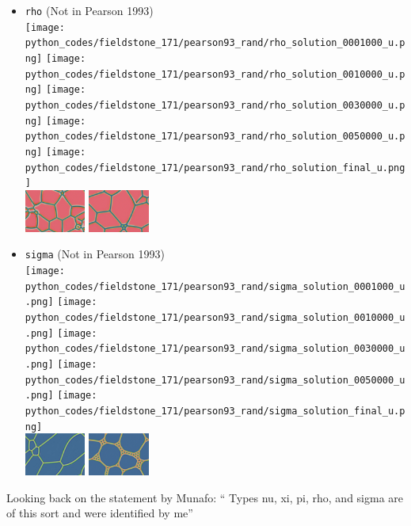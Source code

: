 \begin{itemize}
\item {\tt rho} (Not in Pearson 1993)\\
\texttt{[image: python\_codes/fieldstone\_171/pearson93\_rand/rho\_solution\_0001000\_u.png]}
\texttt{[image: python\_codes/fieldstone\_171/pearson93\_rand/rho\_solution\_0010000\_u.png]}
\texttt{[image: python\_codes/fieldstone\_171/pearson93\_rand/rho\_solution\_0030000\_u.png]}
\texttt{[image: python\_codes/fieldstone\_171/pearson93\_rand/rho\_solution\_0050000\_u.png]}
\texttt{[image: python\_codes/fieldstone\_171/pearson93\_rand/rho\_solution\_final\_u.png]}\\
\includegraphics[height=1.4cm]{python_codes/fieldstone_171/images/munafo_rho1}
\includegraphics[height=1.4cm]{python_codes/fieldstone_171/images/munafo_rho2}

\item {\tt sigma} (Not in Pearson 1993)\\
\texttt{[image: python\_codes/fieldstone\_171/pearson93\_rand/sigma\_solution\_0001000\_u.png]}
\texttt{[image: python\_codes/fieldstone\_171/pearson93\_rand/sigma\_solution\_0010000\_u.png]}
\texttt{[image: python\_codes/fieldstone\_171/pearson93\_rand/sigma\_solution\_0030000\_u.png]}
\texttt{[image: python\_codes/fieldstone\_171/pearson93\_rand/sigma\_solution\_0050000\_u.png]}
\texttt{[image: python\_codes/fieldstone\_171/pearson93\_rand/sigma\_solution\_final\_u.png]}\\
\includegraphics[height=1.4cm]{python_codes/fieldstone_171/images/munafo_sigma1}
\includegraphics[height=1.4cm]{python_codes/fieldstone_171/images/munafo_sigma2}

\end{itemize}

Looking back on the statement by Munafo: ``
Types nu, xi, pi, rho, and sigma are of this sort and were identified by me''




